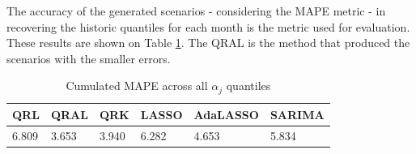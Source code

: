 The accuracy of the generated scenarios - considering the MAPE metric - in recovering the historic quantiles for each month is the metric used for evaluation. These results are shown on Table \ref{tab:results-icaraizinho}. The QRAL is the method that produced the scenarios with the smaller errors.

\begin{table}[h]
\centering
\caption{Cumulated MAPE across all $\alpha_j$ quantiles}
\label{tab:results-icaraizinho}
\begin{tabular}{@{}llllll@{}}
\toprule
QRL & QRAL & QRK   & LASSO & AdaLASSO & SARIMA \\ \midrule
6.809    & 3.653       & 3.940 & 6.282 & 4.653    & 5.834 
\end{tabular}
\end{table}
